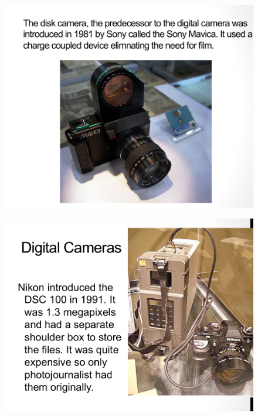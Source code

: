 \documentclass{beamer}
\begin{document}
\begin{frame}
	\begin{figure}
		\centering
		\includegraphics[scale=0.4]{109.jpg}
	\end{figure}
\end{frame}
\begin{frame}
	\begin{figure}
		\centering
		\includegraphics[scale=0.4]{110.jpg}
	\end{figure}
\end{frame}
\end{document}
